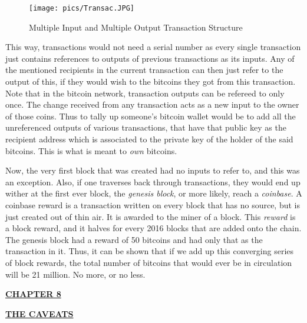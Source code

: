 \documentclass[12pt,a4paper]{report}
\begin{document}
\begin{flushleft}
\begin{figure}[h]
\centering
\caption{Multiple Input and Multiple Output Transaction Structure}
\texttt{[image: pics/Transac.JPG]}
\end{figure}

This way, transactions would not need a serial number as every single transaction just contains references to outputs of previous transactions as its inputs. Any of the mentioned recipients in the current transaction can then just refer to the output of this, if they would wish to  the bitcoins they got from this transaction.\newline
Note that in the bitcoin network, transaction outputs can be refereed to only once. The change received from any transaction acts as a new input to the owner of those coins. Thus to tally up someone's bitcoin wallet would be to add all the unreferenced outputs of various transactions, that have that public key as the recipient address which is associated to the private key of the holder of the said bitcoins. This is what is meant to \textit{own} bitcoins. 
\vspace{10mm}

Now, the very first block that was created had no inputs to refer to, and this was an exception. Also, if one traverses back through transactions, they would end up wither at the first ever block, the \textit{genesis block}, or more likely, reach a \textit{coinbase}. A coinbase reward is a transaction written on every block that has no source, but is just created out of thin air. It is awarded to the miner of a block. This \textit{reward} is a block reward, and it halves for every 2016 blocks that are added onto the chain. The genesis block had a reward of 50 bitcoins and had only that as the transaction in it. Thus, it can be shown that if we add up this converging series of block rewards, the total number of bitcoins that would ever be in circulation will be 21 million. No more, or no less.

\newpage

\begin{center}\underline{ \Large \textbf{CHAPTER 8}}\end{center}
\begin{center}\underline{ \Large \textbf{THE CAVEATS}}\end{center}
\vspace{10mm}


\end{flushleft}
\end{document}
